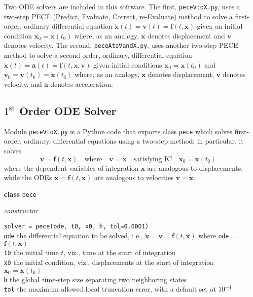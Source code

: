 \label{appSolvers}

Two ODE solvers are included in this software.  The first, \texttt{peceVtoX.py}, uses a two-step PECE (Predict, Evaluate, Correct, re-Evaluate) method to solve a first-order, ordinary differential equation $\dot{\mathbf{x}}(t) = \mathbf{v}(t) = \mathbf{f} (t, \mathbf{x})$ given an initial condition $\mathbf{x}_0 = \mathbf{x}(t_0)$ where, as an analogy, $\mathbf{x}$ denotes displacement and $\mathbf{v}$ denotes velocity.  The second, \texttt{peceAtoVandX.py}, uses another two-step PECE method to solve a second-order, ordinary, differential equation $\ddot{\mathbf{x}}(t) = \mathbf{a}(t) = \mathbf{f}(t, \mathbf{x}, \mathbf{v})$ given initial conditions $\mathbf{x}_0 = \mathbf{x}(t_0)$ and $\mathbf{v}_0 = \mathbf{v}(t_0) = \dot{\mathbf{x}}(t_0)$ where, as an analogy, $\mathbf{x}$ denotes displacement, $\mathbf{v}$ denotes velocity, and $\mathbf{a}$ denotes acceleration.

\subsection{$\mathit{1}^{\text{st}}$ Order ODE Solver}
\label{app1stOrderODEs}

Module \texttt{peceVtoX.py} is a Python code that exports class \texttt{pece} which solves first-order, ordinary, differential equations using a two-step method; in particular, it solves
\begin{displaymath}
    \mathbf{v} = \mathbf{f}(t,\mathbf{x}) 
    \quad \text{where} \quad
    \mathbf{v} = \dot{\mathbf{x}}
    \quad \text{satisfying IC} \quad
    \mathbf{x}_0 = \mathbf{x}(t_0)  
\end{displaymath}
where the dependent variables of integration $\mathbf{x}$ are analogous to displacements, while the ODEs $\dot{\mathbf{x}} = \mathbf{f}(t, \mathbf{x})$ are analogous to velocities $\mathbf{v} = \dot{\mathbf{x}}$.

\bigskip\noindent
\textbf{class} \texttt{pece}

\medskip\noindent
\textit{constructor}

\medskip\noindent
\texttt{solver = pece(ode, t0, x0, h, tol=0.0001)} \\
\indent \texttt{ode} \; the differential equation to be solved, i.e., $\dot{\mathbf{x}} = \mathbf{v} = \mathbf{f} (t, \mathbf{x})$ where \texttt{ode} = $\mathbf{f}(t,\mathbf{x})$ \\
\indent \texttt{t0} \;\;\; the initial time $t$, viz., time at the start of integration \\
\indent \texttt{x0} \;\;\; the initial condition, viz., displacements at the start of integration $\mathbf{x}_0 = \mathbf{x}(t_0)$  \\
\indent \texttt{h} \;\;\;\;\; the global time-step size separating two neighboring states \\
\indent \texttt{tol} \;\hspace{1pt} the maximum allowed local truncation error, with a default set at $10^{-4}$

